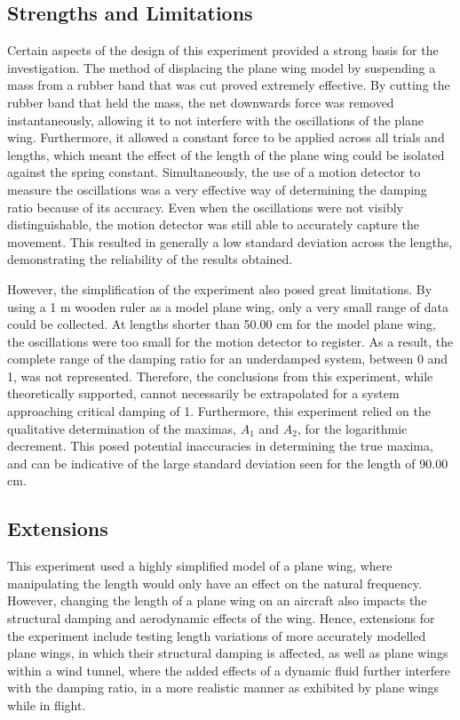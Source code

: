 \documentclass[12pt]{article}
\begin{document}
\vspace{-5mm}

\subsection{Strengths and Limitations}

Certain aspects of the design of this experiment provided a strong basis for the investigation. The method of displacing the plane wing model by suspending a mass from a rubber band that was cut proved extremely effective. By cutting the rubber band that held the mass, the net downwards force was removed instantaneously, allowing it to not interfere with the oscillations of the plane wing. Furthermore, it allowed a constant force to be applied across all trials and lengths, which meant the effect of the length of the plane wing could be isolated against the spring constant. Simultaneously, the use of a motion detector to measure the oscillations was a very effective way of determining the damping ratio because of its accuracy. Even when the oscillations were not visibly distinguishable, the motion detector was still able to accurately capture the movement. This resulted in generally a low standard deviation across the lengths, demonstrating the reliability of the results obtained. 

However, the simplification of the experiment also posed great limitations. By using a 1 m wooden ruler as a model plane wing, only a very small range of data could be collected. At lengths shorter than 50.00 cm for the model plane wing, the oscillations were too small for the motion detector to register. As a result, the complete range of the damping ratio for an underdamped system, between 0 and 1, was not represented. Therefore, the conclusions from this experiment, while theoretically supported, cannot necessarily be extrapolated for a system approaching critical damping of 1. Furthermore, this experiment relied on the qualitative determination of the maximas, $A_1$ and $A_2$, for the logarithmic decrement. This posed potential inaccuracies in determining the true maxima, and can be indicative of the large standard deviation seen for the length of 90.00 cm. 

\vspace{-5mm}

\subsection{Extensions}
This experiment used a highly simplified model of a plane wing, where manipulating the length would only have an effect on the natural frequency. However, changing the length of a plane wing on an aircraft also impacts the structural damping and aerodynamic effects of the wing. Hence, extensions for the experiment include testing length variations of more accurately modelled plane wings, in which their structural damping is affected, as well as plane wings within a wind tunnel, where the added effects of a dynamic fluid further interfere with the damping ratio, in a more realistic manner as exhibited by plane wings while in flight. 


\pagebreak
\printbibliography
\end{document}
